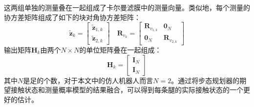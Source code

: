 这两组单独的测量叠在一起组成了卡尔曼滤膜中的测量向量。类似地，每个测量的协方差矩阵组成了如下的块对角协方差矩阵：
\begin{equation}
    \label{equ:est_h_and_f}
    \tilde{\boldsymbol{z}}_k=\left[\begin{array}{c}
        \tilde{\boldsymbol{z}}_{1, k} \\
        \tilde{\boldsymbol{z}}_{2, k}
        \end{array}\right] \quad \boldsymbol{R}_{v_k}=\left[\begin{array}{cc}
        \boldsymbol{R}_{v_{1, k}} & \mathbf{0}_N \\
        \mathbf{0}_N & \boldsymbol{R}_{v_{2, k}}
        \end{array}\right]
\end{equation}
输出矩阵$\boldsymbol{H}_k$由两个$N\times N$的单位矩阵叠在一起组成：
\begin{equation}
    \label{equ:output_matrix}
    \boldsymbol{H}_k=\left[\begin{array}{l}
        \mathbf{I}_N \\
        \mathbf{I}_N
        \end{array}\right]
\end{equation}
其中$N$是足的个数，对于本文中的仿人机器人而言$N=2$。通过将步态规划器的期望接触状态和测量概率模型的结果融合，可以得到每条腿的实际接触状态的一个更好的估计。
